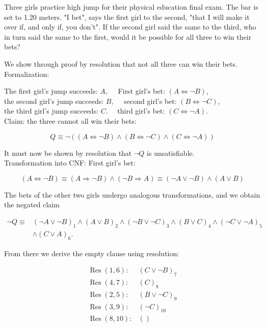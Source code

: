 \documentclass[10pt]{book}
\begin{document}
Three girls practice high jump for their physical education final exam. The bar is set to 1.20 meters. "I bet", says the first girl to the second, "that I will make it over if, and only if, you don't". If the second girl said the same to the third, who in turn said the same to the first, would it be possible for all three to win their bets?

We show through proof by resolution that not all three can win their bets.\\
Formalization:

The first girl's jump succeeds: $A, \quad$ First girl's bet: $(A \Leftrightarrow \neg B)$,\\
the second girl's jump succeeds: $B, \quad$ second girl's bet: $(B \Leftrightarrow \neg C)$,\\
the third girl's jump succeeds: $C . \quad$ third girl's bet: $(C \Leftrightarrow \neg A)$.\\
Claim: the three cannot all win their bets:

$$
Q \equiv \neg((A \Leftrightarrow \neg B) \wedge(B \Leftrightarrow \neg C) \wedge(C \Leftrightarrow \neg A))
$$

It must now be shown by resolution that $\neg Q$ is unsatisfiable.\\
Transformation into CNF: First girl's bet:

$$
(A \Leftrightarrow \neg B) \equiv(A \Rightarrow \neg B) \wedge(\neg B \Rightarrow A) \equiv(\neg A \vee \neg B) \wedge(A \vee B)
$$

The bets of the other two girls undergo analogous transformations, and we obtain the negated claim

$$
\begin{aligned}
\neg Q \equiv & (\neg A \vee \neg B)_{1} \wedge(A \vee B)_{2} \wedge(\neg B \vee \neg C)_{3} \wedge(B \vee C)_{4} \wedge(\neg C \vee \neg A)_{5} \\
& \wedge(C \vee A)_{6} .
\end{aligned}
$$

From there we derive the empty clause using resolution:

$$
\begin{array}{ll}
\operatorname{Res}(1,6): & (C \vee \neg B)_{7} \\
\operatorname{Res}(4,7): & (C)_{8} \\
\operatorname{Res}(2,5): & (B \vee \neg C)_{9} \\
\operatorname{Res}(3,9): & (\neg C)_{10} \\
\operatorname{Res}(8,10): & ()
\end{array}
$$
\end{document}
